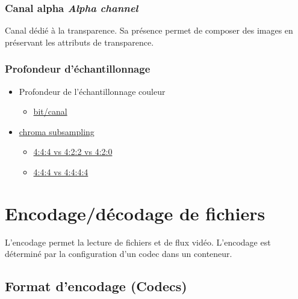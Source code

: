 \documentclass[
  french,
]{book}
\providecommand{\tightlist}{%
  \setlength{\itemsep}{0pt}\setlength{\parskip}{0pt}}
\begin{document}
\hypertarget{canal-alpha-alpha-channel}{%
\subsubsection{\texorpdfstring{Canal alpha \emph{Alpha channel}}{Canal alpha Alpha channel}}\label{canal-alpha-alpha-channel}}

Canal dédié à la transparence.
Sa présence permet de composer des images en préservant les attributs de transparence.

\hypertarget{profondeur-duxe9chantillonnage}{%
\subsubsection{Profondeur d'échantillonnage}\label{profondeur-duxe9chantillonnage}}

\begin{itemize}
\tightlist
\item
  Profondeur de l'échantillonnage couleur

  \begin{itemize}
  \tightlist
  \item
    \href{https://en.wikipedia.org/wiki/Color_depth}{bit/canal}\\
  \end{itemize}
\item
  \href{https://en.wikipedia.org/wiki/Chroma_subsampling\#Sampling_systems_and_ratios}{chroma subsampling}

  \begin{itemize}
  \tightlist
  \item
    \href{https://upload.wikimedia.org/wikipedia/commons/0/06/Colorcomp.jpg}{4:4:4 vs 4:2:2 vs 4:2:0}
  \item
    \href{https://en.wikipedia.org/wiki/Alpha_compositing}{4:4:4 vs 4:4:4:4}
  \end{itemize}
\end{itemize}

\hypertarget{lexique_fichiers}{%
\section{Encodage/décodage de fichiers}\label{lexique_fichiers}}

L'encodage permet la lecture de fichiers et de flux vidéo.
L'encodage est déterminé par la configuration d'un codec dans un conteneur.

\hypertarget{format-dencodage-codecs}{%
\subsection{Format d'encodage (Codecs)}\label{format-dencodage-codecs}}
\end{document}
